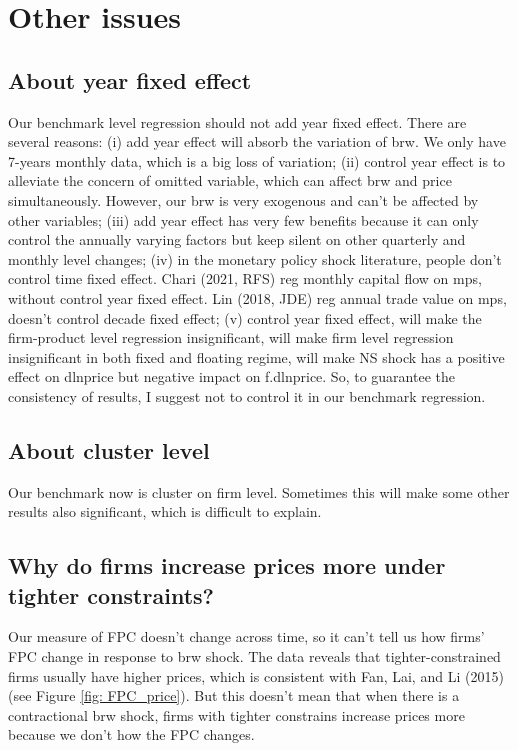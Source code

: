 \documentclass[12pt]{article}
\begin{document}
\section{Other issues}

\subsection{About year fixed effect}
Our benchmark level regression should not add year fixed effect. There are several reasons: (i) add year effect will absorb the variation of brw. We only have 7-years monthly data, which is a big loss of variation; (ii) control year effect is to alleviate the concern of omitted variable, which can affect brw and price simultaneously. However, our brw is very exogenous and can’t be affected by other variables; (iii) add year effect has very few benefits because it can only control the annually varying factors but keep silent on other quarterly and monthly level changes; (iv) in the monetary policy shock literature, people don’t control time fixed effect. Chari (2021, RFS) reg monthly capital flow on mps, without control year fixed effect. Lin (2018, JDE) reg annual trade value on mps, doesn’t control decade fixed effect; (v) control year fixed effect, will make the firm-product level regression insignificant, will make firm level regression insignificant in both fixed and floating regime, will make NS shock has a positive effect on dlnprice but negative impact on f.dlnprice. So, to guarantee the consistency of results, I suggest not to control it in our benchmark regression.

\subsection{About cluster level}
Our benchmark now is cluster on firm level. Sometimes this will make some other results also significant, which is difficult to explain. 

\subsection{Why do firms increase prices more under tighter constraints?}

Our measure of FPC doesn’t change across time, so it can’t tell us how firms’ FPC change in response to brw shock. The data reveals that tighter-constrained firms usually have higher prices, which is consistent with Fan, Lai, and Li (2015) (see Figure \ref{fig: FPC_price}). But this doesn’t mean that when there is a contractional brw shock, firms with tighter constrains increase prices more because we don’t how the FPC changes.
\end{document}
